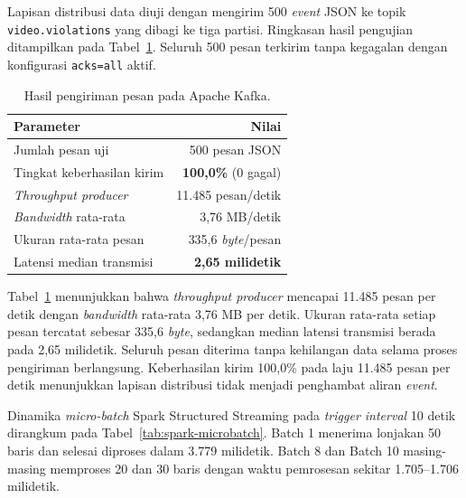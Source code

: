 Lapisan distribusi data diuji dengan mengirim 500 \textit{event} JSON ke topik \texttt{video.violations} yang dibagi ke tiga partisi. Ringkasan hasil pengujian ditampilkan pada Tabel~\ref{tab:kafka-throughput}. Seluruh 500 pesan terkirim tanpa kegagalan dengan konfigurasi \texttt{acks=all} aktif.

\begin{table}[htbp]
\centering
\caption{Hasil pengiriman pesan pada Apache Kafka.}
\label{tab:kafka-throughput}
\begin{tabular}{lr}
\toprule
\textbf{Parameter} & \textbf{Nilai} \\
\midrule
Jumlah pesan uji & 500 pesan JSON \\
Tingkat keberhasilan kirim & \textbf{100,0\%} (0 gagal) \\
\textit{Throughput producer} & 11.485 pesan/detik \\
\textit{Bandwidth} rata-rata & 3,76 MB/detik \\
Ukuran rata-rata pesan & 335,6 \textit{byte}/pesan \\
Latensi median transmisi & \textbf{2,65 milidetik} \\
\bottomrule
\end{tabular}
\end{table}

Tabel~\ref{tab:kafka-throughput} menunjukkan bahwa \textit{throughput producer} mencapai 11.485 pesan per detik dengan \textit{bandwidth} rata-rata 3,76 MB per detik. Ukuran rata-rata setiap pesan tercatat sebesar 335,6 \textit{byte}, sedangkan median latensi transmisi berada pada 2,65 milidetik. Seluruh pesan diterima tanpa kehilangan data selama proses pengiriman berlangsung. Keberhasilan kirim 100,0\% pada laju 11.485 pesan per detik menunjukkan lapisan distribusi tidak menjadi penghambat aliran \textit{event}.

Dinamika \textit{micro-batch} Spark Structured Streaming pada \textit{trigger interval} 10 detik dirangkum pada Tabel~\ref{tab:spark-microbatch}. Batch 1 menerima lonjakan 50 baris dan selesai diproses dalam 3.779 milidetik. Batch 8 dan Batch 10 masing-masing memproses 20 dan 30 baris dengan waktu pemrosesan sekitar 1.705--1.706 milidetik.

